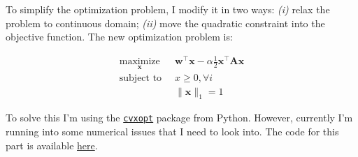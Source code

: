 \documentclass[
]{article}
\begin{document}
To simplify the optimization problem, I modify it in two ways:
\emph{(i)} relax the problem to continuous domain; \emph{(ii)} move the
quadratic constraint into the objective function. The new optimization
problem is:

\[
\begin{aligned}
\underset{\mathbf{x}}{\text{maximize}} \;\; & \mathbf{w}^\intercal\mathbf{x} - \alpha \frac{1}{2} \mathbf{x}^\intercal \mathbf{A} \mathbf{x} \\
\text{subject to} \;\; &  x \ge 0, \forall i\\
                       & \|\mathbf{x}\|_1 = 1
\end{aligned}
\]

To solve this I'm using the \href{https://cvxopt.org}{\texttt{cvxopt}}
package from Python. However, currently I'm running into some numerical
issues that I need to look into. The code for this part is available
\href{https://bitbucket.org/doneata/optim-cut/src/master/cut_qp.py}{here}.
\end{document}

